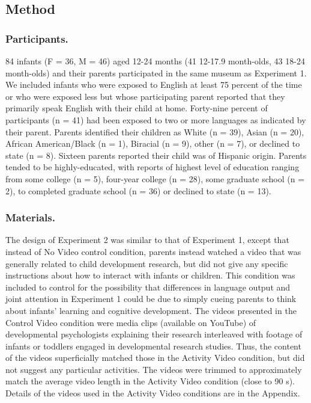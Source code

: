 \documentclass[man,floatsintext]{apa6}
\begin{document}
\hypertarget{method-1}{%
\subsection{Method}\label{method-1}}

\hypertarget{participants.-1}{%
\subsubsection{Participants.}\label{participants.-1}}

84 infants (F = 36, M = 46) aged 12-24 months (41 12-17.9 month-olds, 43 18-24 month-olds) and their parents participated in the same museum as Experiment 1.
We included infants who were exposed to English at least 75 percent of the time or who were exposed less but whose participating parent reported that they primarily speak English with their child at home.
Forty-nine percent of participants (n = 41) had been exposed to two or more languages as indicated by their parent.
Parents identified their children as White (n = 39), Asian (n = 20), African American/Black (n = 1), Biracial (n = 9), other (n = 7), or declined to state (n = 8).
Sixteen parents reported their child was of Hispanic origin.
Parents tended to be highly-educated, with reports of highest level of education ranging from some college (n = 5), four-year college (n = 28), some graduate school (n = 2), to completed graduate school (n = 36) or declined to state (n = 13).

\hypertarget{materials.-1}{%
\subsubsection{Materials.}\label{materials.-1}}

The design of Experiment 2 was similar to that of Experiment 1, except that instead of No Video control condition, parents instead watched a video that was generally related to child development research, but did not give any specific instructions about how to interact with infants or children.
This condition was included to control for the possibility that differences in language output and joint attention in Experiment 1 could be due to simply cueing parents to think about infants' learning and cognitive development.
The videos presented in the Control Video condition were media clips (available on YouTube) of developmental psychologists explaining their research interleaved with footage of infants or toddlers engaged in developmental research studies.
Thus, the content of the videos superficially matched those in the Activity Video condition, but did not suggest any particular activities.
The videos were trimmed to approximately match the average video length in the Activity Video condition (close to 90 s).
Details of the videos used in the Activity Video conditions are in the Appendix.
\end{document}
